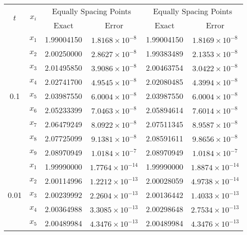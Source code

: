 \begin{example}
	
	\begin{table}[ht]
		\renewcommand{\arraystretch}{1.5}
		\centering
		\begin{english}
\begin{tabular}{|c|c|c|c|c|c|}
			\hline
			\multirow{2}{*}{\( t \)} & \multirow{2}{*}{\( x_i \)} & \multicolumn{2}{c|}{Equally Spacing Points} & \multicolumn{2}{c|}{Equally Spacing Points} \\
			\cline{3-6}
			& & Exact & Error & Exact & Error \\
			\hline
			\multirow{9}{*}{0.1} & \( x_1 \) & 1.99004150 & \( 1.8168 \times 10^{-8} \) & 1.99004150 & \( 1.8169 \times 10^{-8} \) \\
			& \( x_2 \) & 2.00250000 & \( 2.8627 \times 10^{-8} \) & 1.99383489 & \( 2.1353 \times 10^{-8} \) \\
			& \( x_3 \) & 2.01495850 & \( 3.9086 \times 10^{-8} \) & 2.00463754 & \( 3.0422 \times 10^{-8} \) \\
			& \( x_4 \) & 2.02741700 & \( 4.9545 \times 10^{-8} \) & 2.02080485 & \( 4.3994 \times 10^{-8} \) \\
			& \( x_5 \) & 2.03987550 & \( 6.0004 \times 10^{-8} \) & 2.03987550 & \( 6.0004 \times 10^{-8} \) \\
			& \( x_6 \) & 2.05233399 & \( 7.0463 \times 10^{-8} \) & 2.05894614 & \( 7.6014 \times 10^{-8} \) \\
			& \( x_7 \) & 2.06479249 & \( 8.0922 \times 10^{-8} \) & 2.07511345 & \( 8.9587 \times 10^{-8} \) \\
			& \( x_8 \) & 2.07725099 & \( 9.1381 \times 10^{-8} \) & 2.08591611 & \( 9.8656 \times 10^{-8} \) \\
			& \( x_9 \) & 2.08970949 & \( 1.0184 \times 10^{-7} \) & 2.08970949 & \( 1.0184 \times 10^{-7} \) \\
			\hline
			\multirow{9}{*}{0.01} & \( x_1 \) & 1.99990000 & \( 1.7764 \times 10^{-14} \) & 1.99990000 & \( 1.8874 \times 10^{-14} \) \\
			& \( x_2 \) & 2.00114996 & \( 1.2212 \times 10^{-13} \) & 2.00028059 & \( 4.9738 \times 10^{-14} \) \\
			& \( x_3 \) & 2.00239992 & \( 2.2604 \times 10^{-13} \) & 2.00136442 & \( 1.4033 \times 10^{-13} \) \\
			& \( x_4 \) & 2.00364988 & \( 3.3085 \times 10^{-13} \) & 2.00298648 & \( 2.7534 \times 10^{-13} \) \\
			& \( x_5 \) & 2.00489984 & \( 4.3476 \times 10^{-13} \) & 2.00489984 & \( 4.3476 \times 10^{-13} \) \\

\end{tabular}
\end{english}
\end{table}
\end{example}
